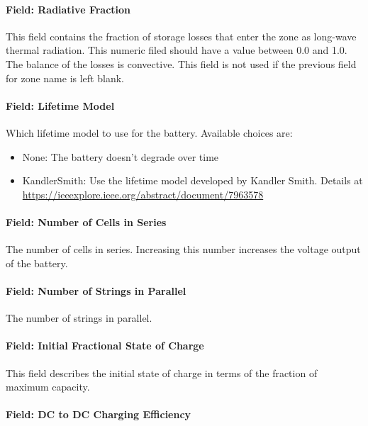 \paragraph{Field: Radiative Fraction}\label{liion-rad-frac}

This field contains the fraction of storage losses that enter the zone as long-wave thermal radiation. This numeric filed should have a value between 0.0 and 1.0. The balance of the losses is convective. This field is not used if the previous field for zone name is left blank.

\paragraph{Field: Lifetime Model}\label{liion-lifetime-model}

Which lifetime model to use for the battery. Available choices are:

\begin{itemize}
  \item None: The battery doesn't degrade over time
  \item KandlerSmith: Use the lifetime model developed by Kandler Smith. Details at \url{https://ieeexplore.ieee.org/abstract/document/7963578}
\end{itemize}

\paragraph{Field: Number of Cells in Series}\label{liion-n-series}

The number of cells in series. Increasing this number increases the voltage output of the battery.

\paragraph{Field: Number of Strings in Parallel}\label{liion-n-parallel}

The number of strings in parallel.

\paragraph{Field: Initial Fractional State of Charge}\label{liion-init-soc}

This field describes the initial state of charge in terms of the fraction of maximum capacity.

\paragraph{Field: DC to DC Charging Efficiency}\label{liion-dc-dc-charg-eff}

